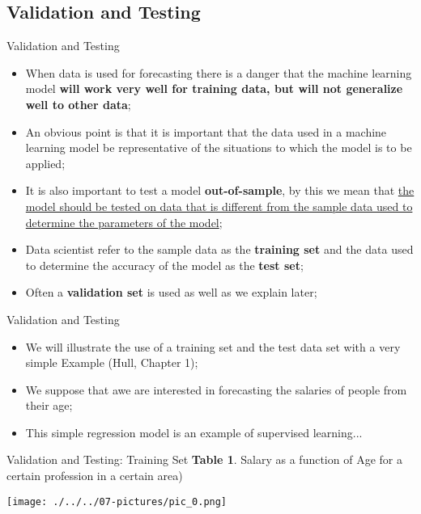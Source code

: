 \documentclass[11pt]{beamer}
\begin{document}
\subsection[subsection]{Validation and Testing}
%
\begin{frame}{Validation and Testing}
	\begin{itemize}
		\item When data is used for forecasting there is a danger that the machine learning model \textbf{will work very well for training data, but will not generalize well to other data};
		\item An obvious point is that it is important that the data used in a machine learning model be representative of the situations to which the model is to be applied;
		\item It is also important to test a model \textbf{out-of-sample}, by this we mean that \ul{the model should be tested on data that is different from the sample data used to determine the parameters of the model};
		\item Data scientist refer to the sample data as the \textbf{training set} and the data used to determine the accuracy of the model as the \textbf{test set};
		\item Often a \textbf{validation set} is used as well as we explain later;
	\end{itemize}
\end{frame}
\begin{frame}{Validation and Testing}
\begin{itemize}
\item We will illustrate the use of a training set and the test data set with a very simple Example (Hull, Chapter 1);
\item We suppose that awe are interested in forecasting the salaries of people from their age;
\item This simple regression model is an example of supervised learning...
\end{itemize}
\end{frame}
\begin{frame}{Validation and Testing: Training Set}
\textbf{Table 1}. Salary as a function of Age for a certain profession in a certain area)
	\begin{center}
	\texttt{[image: ./../../07-pictures/pic\_0.png]}
	\end{center}
\end{frame}
\end{document}
